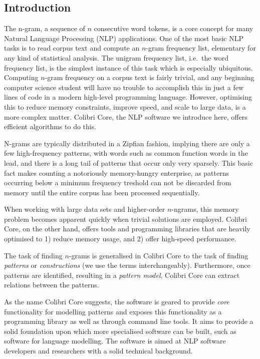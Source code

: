 \documentclass[a4paper,12pt]{article}
\begin{document}
\subsection{Introduction}

The n-gram, a sequence of $n$ consecutive word tokens, is a core concept for
many Natural Language Processing (NLP) applications. One of the most basic NLP
tasks is to read corpus text and compute an $n$-gram frequency list, elementary
for any kind of statistical analysis. The unigram frequency list, i.e.\ the
word frequency list, is the simplest instance of this task which is especially
ubiquitous. Computing $n$-gram frequency on a corpus text is fairly trivial,
and any beginning computer science student will have no trouble to accomplish
this in just a few lines of code in a modern high-level programming language.
However, optimising this to reduce memory constraints, improve speed, and scale
to large data, is a more complex matter. Colibri Core, the NLP software we
introduce here, offers efficient algorithms to do this.

N-grams are typically distributed in a Zipfian fashion, implying there are only
a few high-frequency patterns, with words such as common function words in the
lead, and there is a long tail of patterns that occur only very sparsely. This
basic fact makes counting a notoriously memory-hungry enterprise, as patterns
occurring below a minimum frequency treshold can not be discarded from
memory until the entire corpus has been processed sequentially. 

When working with large data sets and higher-order $n$-ngrams, this memory
problem becomes apparent quickly when trivial solutions are employed. Colibri
Core, on the other hand, offers tools and programming libraries that are
heavily optimised to 1) reduce memory usage, and 2) offer high-speed performance.

The task of finding $n$-grams is generalised in Colibri Core to the task of
finding \emph{patterns} or \emph{constructions} (we use the terms
interchangeably). Furthermore, once patterns are identified, resulting in a
\emph{pattern model}, Colibri Core can extract relations between the patterns.

As the name Colibri Core suggests, the software is geared to provide
\emph{core} functionality for modelling patterns and exposes this functionality
as a programming library as well as through command line tools. It aims to
provide a solid foundation upon which more specialised software can be built,
such as software for language modelling. The software is aimed at
NLP software developers and researchers with a solid technical background. 
\end{document}
